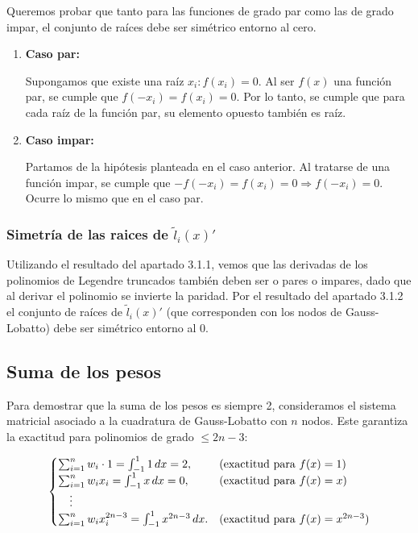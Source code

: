 \documentclass[a4paper]{article}
\begin{document}
Queremos probar que tanto para las funciones de grado par como las de grado impar, el conjunto de raíces debe ser simétrico entorno al cero.
\begin{enumerate}
\item \textbf{Caso par:}

Supongamos que existe una raíz $x_i:f(x_i)=0$. Al ser $f(x)$ una función par, se cumple que $f(-x_i)=f(x_i)=0$. Por lo tanto, se cumple que para cada raíz de la función par, su elemento opuesto también es raíz.

\item \textbf{Caso impar:}

Partamos de la hipótesis planteada en el caso anterior. Al tratarse de una función impar, se cumple que $-f(-x_i)=f(x_i)=0\Rightarrow f(-x_i)=0$. Ocurre lo mismo que en el caso par.
\end{enumerate}
\subsubsection{\boldmath Simetría de las raices de $\tilde l_i(x)'$}

Utilizando el resultado del apartado 3.1.1, vemos que las derivadas de los polinomios de Legendre truncados también deben ser o pares o impares, dado que al derivar el polinomio se invierte la paridad. Por el resultado del apartado 3.1.2 el conjunto de raíces de $\tilde l_i(x)'$ (que corresponden con los nodos de Gauss-Lobatto) debe ser simétrico entorno al 0.






\subsection{Suma de los pesos}
\noindent Para demostrar que la suma de los pesos es siempre 2, consideramos el sistema matricial asociado a la cuadratura de Gauss-Lobatto con \( n \) nodos. Este garantiza la exactitud para polinomios de grado \( \leq 2n-3 \):

\[
\begin{cases}
    \sum_{i=1}^n w_i \cdot 1 = \int_{-1}^1 1 \, dx = 2, & \text{(exactitud para \( f(x) = 1 \))} \\
    \sum_{i=1}^n w_i x_i = \int_{-1}^1 x \, dx = 0, & \text{(exactitud para \( f(x) = x \))} \\
    \quad \vdots & \\
    \sum_{i=1}^n w_i x_i^{2n-3} = \int_{-1}^1 x^{2n-3} \, dx. & \text{(exactitud para \( f(x) = x^{2n-3} \))}
\end{cases}
\]
\end{document}
